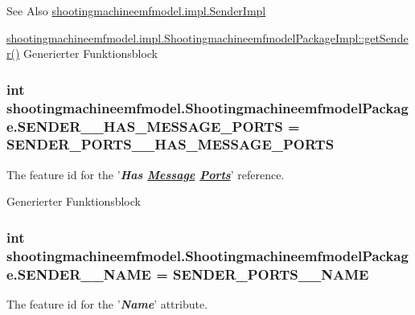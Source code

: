 \begin{DoxySeeAlso}{See Also}
\hyperlink{classshootingmachineemfmodel_1_1impl_1_1_sender_impl}{shootingmachineemfmodel.\-impl.\-Sender\-Impl} 

\hyperlink{classshootingmachineemfmodel_1_1impl_1_1_shootingmachineemfmodel_package_impl_ae9d64d90ba3a6d16470ba73e5abc0808}{shootingmachineemfmodel.\-impl.\-Shootingmachineemfmodel\-Package\-Impl\-::get\-Sender()} Generierter Funktionsblock 
\end{DoxySeeAlso}
\hypertarget{interfaceshootingmachineemfmodel_1_1_shootingmachineemfmodel_package_a7e39218752c6badebdd62172a1e09cf9}{
\subsubsection[{S\-E\-N\-D\-E\-R\-\_\-\-\_\-\-H\-A\-S\-\_\-\-M\-E\-S\-S\-A\-G\-E\-\_\-\-P\-O\-R\-T\-S}]{\setlength{\rightskip}{0pt plus 5cm}int shootingmachineemfmodel.\-Shootingmachineemfmodel\-Package.\-S\-E\-N\-D\-E\-R\-\_\-\-\_\-\-H\-A\-S\-\_\-\-M\-E\-S\-S\-A\-G\-E\-\_\-\-P\-O\-R\-T\-S = {\bf S\-E\-N\-D\-E\-R\-\_\-\-P\-O\-R\-T\-S\-\_\-\-\_\-\-H\-A\-S\-\_\-\-M\-E\-S\-S\-A\-G\-E\-\_\-\-P\-O\-R\-T\-S}}}\label{interfaceshootingmachineemfmodel_1_1_shootingmachineemfmodel_package_a7e39218752c6badebdd62172a1e09cf9}
The feature id for the '{\itshape {\bfseries Has \hyperlink{interfaceshootingmachineemfmodel_1_1_message}{Message} \hyperlink{interfaceshootingmachineemfmodel_1_1_ports}{Ports}}}' reference.

Generierter Funktionsblock  \hypertarget{interfaceshootingmachineemfmodel_1_1_shootingmachineemfmodel_package_a1ed828768d7bc69daa2e850c3d7dc8ac}{
\subsubsection[{S\-E\-N\-D\-E\-R\-\_\-\-\_\-\-N\-A\-M\-E}]{\setlength{\rightskip}{0pt plus 5cm}int shootingmachineemfmodel.\-Shootingmachineemfmodel\-Package.\-S\-E\-N\-D\-E\-R\-\_\-\-\_\-\-N\-A\-M\-E = {\bf S\-E\-N\-D\-E\-R\-\_\-\-P\-O\-R\-T\-S\-\_\-\-\_\-\-N\-A\-M\-E}}}\label{interfaceshootingmachineemfmodel_1_1_shootingmachineemfmodel_package_a1ed828768d7bc69daa2e850c3d7dc8ac}
The feature id for the '{\itshape {\bfseries Name}}' attribute.

